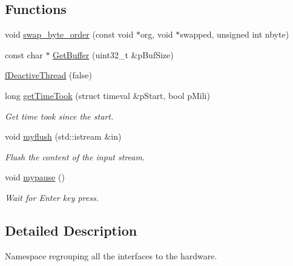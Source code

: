 \subsection*{Functions}
\begin{DoxyCompactItemize}
\item 
void \hyperlink{namespace_ph2___hw_interface_ad58bc815dfbb93c57791f3aecc84a1ea}{swap\-\_\-byte\-\_\-order} (const void $\ast$org, void $\ast$swapped, unsigned int nbyte)
\item 
const char $\ast$ \hyperlink{namespace_ph2___hw_interface_ac8fb2ee28c5a7f6e417125775dcb0fd7}{Get\-Buffer} (uint32\-\_\-t \&p\-Buf\-Size)
\item 
\hyperlink{namespace_ph2___hw_interface_a45c84dee08a5b37d565bbcd5eeab2b4d}{f\-Deactive\-Thread} (false)
\item 
long \hyperlink{namespace_ph2___hw_interface_a033a07cbe28368de19d534ef7cd3325d}{get\-Time\-Took} (struct timeval \&p\-Start, bool p\-Mili)
\begin{DoxyCompactList}\small\item\em Get time took since the start. \end{DoxyCompactList}\item 
void \hyperlink{namespace_ph2___hw_interface_a2fe2ee1ddb69c79c23bf9b0b2fa58f67}{myflush} (std\-::istream \&in)
\begin{DoxyCompactList}\small\item\em Flush the content of the input stream. \end{DoxyCompactList}\item 
void \hyperlink{namespace_ph2___hw_interface_a20399ed909de2641f1e7e086a4ec3667}{mypause} ()
\begin{DoxyCompactList}\small\item\em Wait for Enter key press. \end{DoxyCompactList}\end{DoxyCompactItemize}


\subsection{Detailed Description}
Namespace regrouping all the interfaces to the hardware. 

